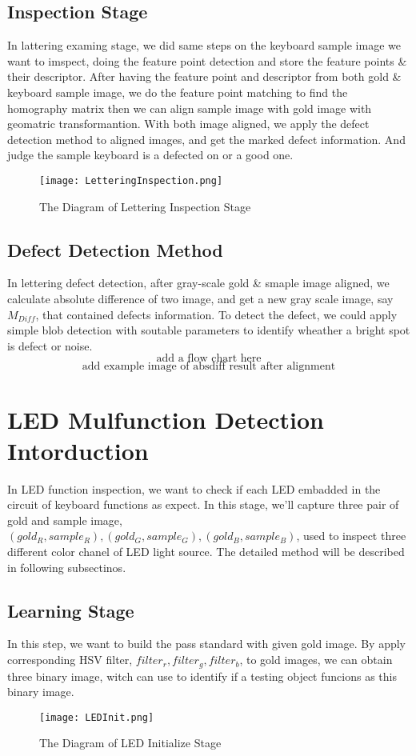 	\subsection{Inspection Stage}
		In lattering examing stage, we did same steps on the keyboard sample image we want to imspect, doing the feature point detection and store the feature points \& their descriptor.
		After having the feature point and descriptor from both gold \& keyboard sample image, we do the feature point matching to find the homography matrix then we can align sample image with gold image with geomatric transformantion. 
		With both image aligned, we apply the defect detection method to aligned images, and get the marked defect information.
		And judge the sample keyboard is a defected on or a good one.
		\begin{figure}
			\texttt{[image: LetteringInspection.png]}
			\caption{The Diagram of Lettering Inspection Stage}
			\label{fig:LetteringInspection}
		\end{figure}

	\subsection{Defect Detection Method}
		In lettering defect detection, after gray-scale gold \& smaple image aligned, we calculate absolute difference of two image, and get a new gray scale image, say $M_{Diff}$, that contained defects information.
		To detect the defect, we could apply simple blob detection with soutable parameters to identify wheather a bright spot is defect or noise.
		$$ \textrm{add a flow chart here} $$
		$$ \textrm{add example image of absdiff result after alignment} $$

\section{LED Mulfunction Detection Intorduction}
	In LED function inspection, we want to check if each LED embadded in the circuit of keyboard functions as expect.
	In this stage, we'll capture three pair of gold and sample image, $(gold_R, sample_R), (gold_G, sample_G), (gold_B, sample_B)$, used to inspect three different color chanel of LED light source.
	The detailed method will be described in following subsectinos.
	\subsection{Learning Stage}
		In this step, we want to build the pass standard with given gold image.
		By apply corresponding HSV filter, $filter_r, filter_g, filter_b$, to gold images, we can obtain three binary image, witch can use to identify if a testing object funcions as this binary image.
		\begin{figure}
			\texttt{[image: LEDInit.png]}
			\caption{The Diagram of LED Initialize Stage}
			\label{fig:LEDInit}
		\end{figure}

